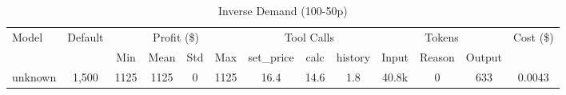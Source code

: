 \begin{table}[h]
\centering
\small
\caption{Inverse Demand (100-50p)}
\begin{tabular}{|l|c|c|c|c|c|c|c|c|c|c|c|c|}
\hline
\multirow{2}{*}{Model} & \multirow{2}{*}{Default} & \multicolumn{4}{c|}{Profit (\$)} & \multicolumn{3}{c|}{Tool Calls} & \multicolumn{3}{c|}{Tokens} & \multirow{2}{*}{Cost (\$)} \\
\cline{3-12}
& & Min & Mean & Std & Max & set\_price & calc & history & Input & Reason & Output & \\
\hline
unknown & 1,500 & 1125 & 1125 & 0 & 1125 & 16.4 & 14.6 & 1.8 & 40.8k & 0 & 633 & 0.0043 \\
\hline
\end{tabular}
\end{table}